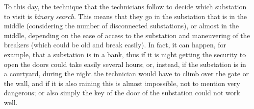 To this day, the technique that the technicians follow to decide which substation to visit is \emph{binary search}. This means that they go in the substation that is in the middle (considering the number of disconnected substations), or almost in the middle, depending on the ease of access to the substation and maneuvering of the breakers (which could be old and break easily). In fact, it can happen, for example, that a substation is in a bank, thus if it is night getting the security to open the doors could take easily several hours; or, instead, if the substation is in a courtyard, during the night the technician would have to climb over the gate or the wall, and if it is also raining this is almost impossible, not to mention very dangerous; or also simply the key of the door of the substation could not work well.

